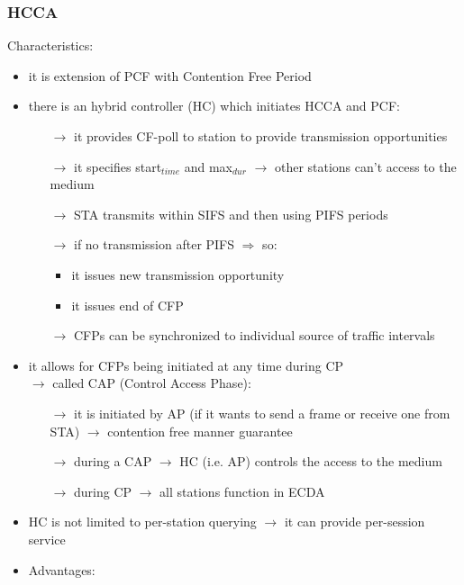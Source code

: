 \subsubsection{HCCA}
Characteristics:
\begin{itemize}
    \item it is extension of PCF with Contention Free Period
    \item there is an hybrid controller (HC) which initiates HCCA and PCF:
    \begin{itemize}
        \item[$\rightarrow$] it provides CF-poll to station to provide transmission opportunities
        \item[$\rightarrow$] it specifies start$_{time}$ and max$_{dur}$ $\rightarrow$ other stations can't access to the medium
        \item[$\rightarrow$] STA transmits within SIFS and then using PIFS periods
        \item[$\rightarrow$] if no transmission after PIFS $\Rightarrow$ so:
        \begin{itemize}
            \item it issues new transmission opportunity
            \item it issues end of CFP
        \end{itemize} 
        \item[$\rightarrow$] CFPs can be synchronized to individual source of traffic intervals
    \end{itemize} 
    \item it allows for CFPs being initiated at any time during CP\\
    $\rightarrow$ called CAP (Control Access Phase):
    \begin{itemize}
        \item[$\rightarrow$] it is initiated by AP (if it wants to send a frame or receive one from STA) $\rightarrow$ contention free manner guarantee
        \item[$\rightarrow$] during a CAP $\rightarrow$ HC (i.e. AP) controls the access to the medium
        \item[$\rightarrow$] during CP $\rightarrow$ all stations function in ECDA
    \end{itemize}
    \item HC is not limited to per-station querying $\rightarrow$ it can provide per-session service
    \item Advantages:
    \begin{itemize}

\end{itemize}
\end{itemize}

